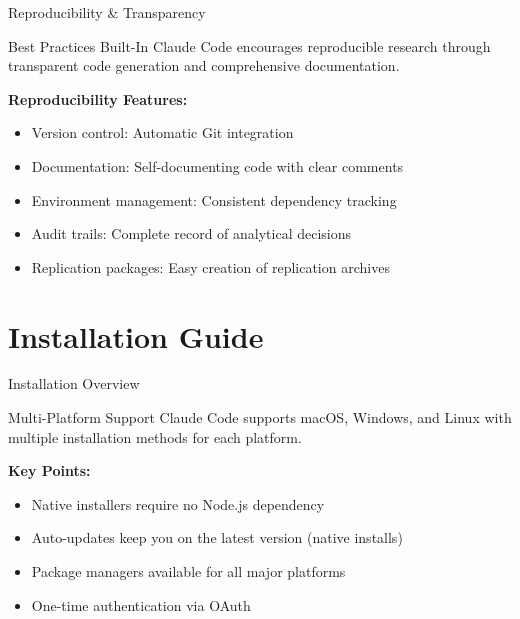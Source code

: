 \documentclass[10pt]{beamer}
\begin{document}
	\begin{frame}{Reproducibility \& Transparency}
		\begin{exampleblock}{Best Practices Built-In}
			Claude Code encourages reproducible research through transparent code generation and comprehensive documentation.
		\end{exampleblock}
		
		\vspace{0.5cm}
		
		\textbf{Reproducibility Features:}
		\begin{itemize}
			\item \alert{Version control:} Automatic Git integration
			\item \alert{Documentation:} Self-documenting code with clear comments
			\item \alert{Environment management:} Consistent dependency tracking
			\item \alert{Audit trails:} Complete record of analytical decisions
			\item \alert{Replication packages:} Easy creation of replication archives
		\end{itemize}
	\end{frame}
	
	\section{Installation Guide}
	
	\begin{frame}{Installation Overview}
		\begin{block}{Multi-Platform Support}
			Claude Code supports macOS, Windows, and Linux with multiple installation methods for each platform.
		\end{block}
		
		\vspace{0.5cm}
		
		\textbf{Key Points:}
		\begin{itemize}
			\item \alert{Native installers} require no Node.js dependency
			\item \alert{Auto-updates} keep you on the latest version (native installs)
			\item \alert{Package managers} available for all major platforms
			\item \alert{One-time authentication} via OAuth
		\end{itemize}
	\end{frame}
	
\end{document}
